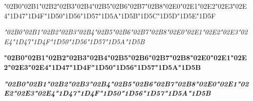 {\LibertinusSerifPatch
	\char"02B0\gs \char"02B1\gs \char"02B2\gs \char"02B3\gs \char"02B4\gs \char"02B5\gs \char"02B6\gs \char"02B7\gs \char"02B8\gs \char"02E0\gs \char"02E1\gs \char"02E2\gs \char"02E3\gs \char"02E4\gs \char"1D47\gs \char"1D4F\gs \char"1D50\gs \char"1D56\gs \char"1D57\gs \char"1D5A\gs \char"1D5B\gs \char"1D5C\gs \char"1D5D\gs \char"1D5E\gs \char"1D5F\gs
}

{\LibertinusSerifPatch\itshape 
	\char"02B0\gs \char"02B1\gs \char"02B2\gs \char"02B3\gs \char"02B4\gs \char"02B5\gs \char"02B6\gs \char"02B7\gs \char"02B8\gs \char"02E0\gs \char"02E1\gs \char"02E2\gs \char"02E3\gs \char"02E4\gs \char"1D47\gs \char"1D4F\gs \char"1D50\gs \char"1D56\gs \char"1D57\gs \char"1D5A\gs \char"1D5B\gs
}

{\LibertinusSerifPatch\bfseries 
	\char"02B0\gs \char"02B1\gs \char"02B2\gs \char"02B3\gs \char"02B4\gs \char"02B5\gs \char"02B6\gs \char"02B7\gs \char"02B8\gs \char"02E0\gs \char"02E1\gs \char"02E2\gs \char"02E3\gs \char"02E4\gs \char"1D47\gs \char"1D4F\gs \char"1D50\gs \char"1D56\gs \char"1D57\gs \char"1D5A\gs \char"1D5B\gs
}

{\LibertinusSerifPatch\itshape\bfseries 
	\char"02B0\gs \char"02B1\gs \char"02B2\gs \char"02B3\gs \char"02B4\gs \char"02B5\gs \char"02B6\gs \char"02B7\gs \char"02B8\gs \char"02E0\gs \char"02E1\gs \char"02E2\gs \char"02E3\gs \char"02E4\gs \char"1D47\gs \char"1D4F\gs \char"1D50\gs \char"1D56\gs \char"1D57\gs \char"1D5A\gs \char"1D5B\gs
}
